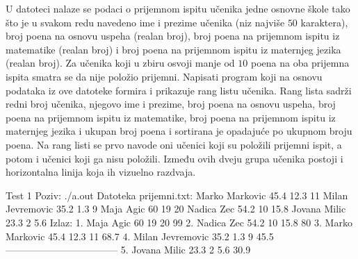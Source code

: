 \begin{Exercise}[label=705]
U datoteci  nalaze se podaci o prijemnom ispitu učenika jedne osnovne škole tako što je u svakom redu navedeno ime i prezime učenika (niz najviše $50$ karaktera), broj poena na osnovu uspeha (realan broj), broj poena na prijemnom ispitu iz matematike (realan broj) i broj poena na prijemnom ispitu iz maternjeg jezika (realan broj). Za učenika koji u zbiru osvoji manje od $10$ poena na oba prijemna ispita smatra se da nije položio prijemni. Napisati program koji na osnovu podataka iz ove datoteke formira i prikazuje rang listu učenika. Rang lista sadrži redni broj učenika, njegovo ime i prezime, broj poena na osnovu uspeha, broj poena na prijemnom ispitu iz matematike, broj poena na prijemnom ispitu iz maternjeg jezika i ukupan broj poena i sortirana je opadajuće po ukupnom broju poena. Na rang listi se prvo navode oni učenici koji su položili prijemni ispit, a potom i učenici koji ga nisu položili. Između ovih dveju grupa učenika postoji i horizontalna linija koja ih vizuelno razdvaja. 
\begin{maxitest}
\begin{test}{Test 1}
Poziv: ./a.out
Datoteka prijemni.txt:
   Marko Markovic 45.4 12.3 11         
   Milan Jevremovic 35.2 1.3 9         
   Maja Agic 60 19 20                  
   Nadica Zec 54.2 10 15.8             
   Jovana Milic 23.3 2 5.6
Izlaz:
	1. Maja Agic 60 19 20 99
	2. Nadica Zec 54.2 10 15.8 80
	3. Marko Markovic 45.4 12.3 11 68.7
	4. Milan Jevremovic 35.2 1.3 9 45.5
	-----------------------------------
	5. Jovana Milic 23.3 2 5.6 30.9
\end{test}
\end{maxitest}

\end{Exercise}
\begin{Answer}[ref=705]
\end{Answer}

